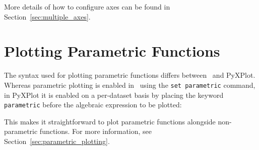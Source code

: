 \noindent More details of how to configure axes can be found in
Section~\ref{sec:multiple_axes}.

\section{Plotting Parametric Functions}

The syntax used for plotting parametric functions differs between \gnuplot\ and
PyXPlot. Whereas parametric plotting is enabled in \gnuplot\ using the {\tt set
parametric} command, in PyXPlot it is enabled on a per-dataset basis by placing
the keyword {\tt parametric} before the algebraic expression to be plotted:

\vspace{3mm}
\newline
{}\newline
{}
\vspace{3mm}\newline
{}\newline
{}
\vspace{3mm}

\noindent This makes it straightforward to plot parametric functions alongside
non-parametric functions. For more information, see
Section~\ref{sec:parametric_plotting}.


